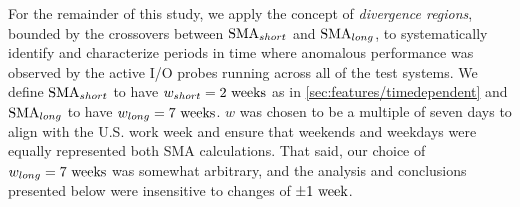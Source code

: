 For the remainder of this study, we apply the concept of \emph{divergence regions}, bounded by the crossovers between $\textup{SMA}_{short}$ and $\textup{SMA}_{long}$, to systematically identify and characterize periods in time where anomalous performance was observed by the active I/O probes running across all of the test systems.
We define $\textup{SMA}_{short}$ to have $w_{short} = 2 \textup{ weeks}$ as in \ref{sec:features/timedependent} and $\textup{SMA}_{long}$ to have $w_{long} = 7 \textup{ weeks}$.
$w$ was chosen to be a multiple of seven days to align with the U.S. work week and ensure that weekends and weekdays were equally represented both SMA calculations.
That said, our choice of $w_{long} = 7 \textup{ weeks}$ was somewhat arbitrary, and the analysis and conclusions presented below were insensitive to changes of $\pm 1 \textup{ week}$.

